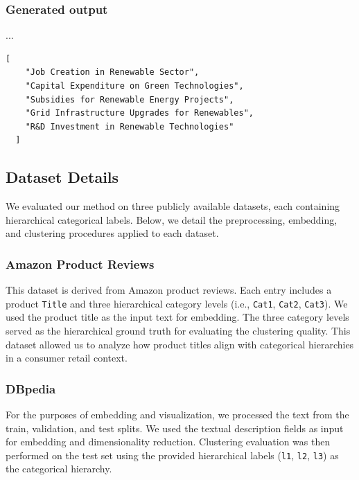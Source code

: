 \subsubsection*{Generated output}

...

\begin{lstlisting}[style=json]
  [
    "Job Creation in Renewable Sector",
    "Capital Expenditure on Green Technologies",
    "Subsidies for Renewable Energy Projects",
    "Grid Infrastructure Upgrades for Renewables",
    "R&D Investment in Renewable Technologies"
  ]
  \end{lstlisting}
\subsection{Dataset Details}
We evaluated our method on three publicly available datasets, each containing hierarchical categorical labels. Below, we detail the preprocessing, embedding, and clustering procedures applied to each dataset.

\subsubsection*{Amazon Product Reviews}

This dataset is derived from Amazon product reviews. Each entry includes a product \texttt{Title} and three hierarchical category levels (i.e., \texttt{Cat1}, \texttt{Cat2}, \texttt{Cat3}). We used the product title as the input text for embedding. The three category levels served as the hierarchical ground truth for evaluating the clustering quality. This dataset allowed us to analyze how product titles align with categorical hierarchies in a consumer retail context.

\subsubsection*{DBpedia}

For the purposes of embedding and visualization, we processed the text from the train, validation, and test splits. We used the textual description fields as input for embedding and dimensionality reduction. Clustering evaluation was then performed on the test set using the provided hierarchical labels (\texttt{l1}, \texttt{l2}, \texttt{l3}) as the categorical hierarchy.

